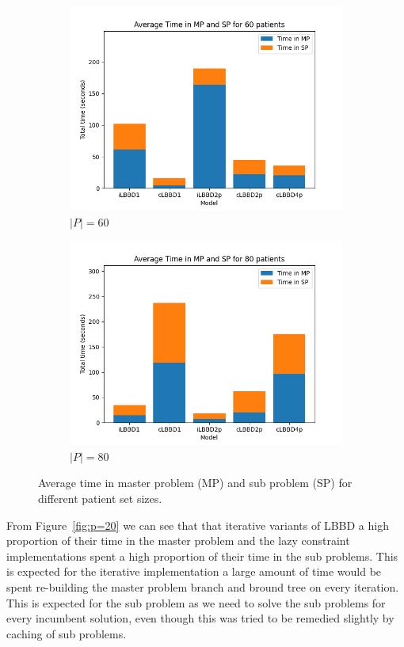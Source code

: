 \begin{figure}
\begin{subfigure}[b]{0.35\textwidth}
        \includegraphics[width=\textwidth]{plots/(60_timeinMPSP).png}
        \caption{$|P|=60$}\label{fig:p=60}
    \end{subfigure}
    \begin{subfigure}[b]{0.35\textwidth}
        \centering
        \includegraphics[width=\textwidth]{plots/(80_timeinMPSP).png}
        \caption{$|P|=80$}\label{fig:p=80}
    \end{subfigure}
    \caption{Average time in master problem (MP) and sub problem (SP) for different patient set sizes.}\label{fig:MPSPtime}
\end{figure}

From Figure~\ref{fig:p=20} we can see that that iterative variants of LBBD a high proportion of their time in the master problem and the lazy constraint implementations spent a high proportion of their time in the sub problems. This is expected for the iterative implementation a large amount of time would be spent re-building the master problem branch and bround tree on every iteration. This is expected for the sub problem as we need to solve the sub problems for every incumbent solution, even though this was tried to be remedied slightly by caching of sub problems.  

